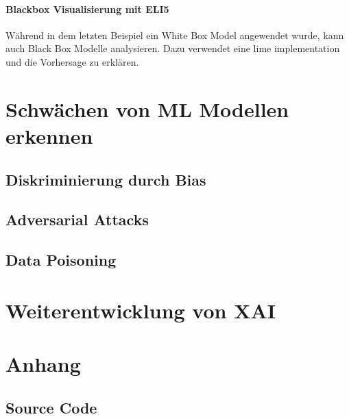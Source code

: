 \documentclass[
  12pt, %
  a4paper, %
  oneside, %
  openany, 
  numbers=noenddot, %
  BCOR=5mm, %
  parskip=half*, %
  thesis, %
]{bfhbook}
\begin{document}
\subsubsection*{Blackbox Visualisierung mit ELI5}
Während in dem letzten Beispiel ein White Box Model angewendet wurde, kann \cite{ELI5} auch Black Box Modelle analysieren. Dazu verwendet \cite{ELI5} eine \Gls{lime} implementation und die Vorhersage zu erklären.

\chapter{Schwächen von ML Modellen erkennen}
\section{Diskriminierung durch Bias}
\section{Adversarial Attacks}
\section{Data Poisoning}

\chapter{Weiterentwicklung von XAI}

\chapter{Anhang}
\section{Source Code}
\label{dt-vis}
\end{document}
